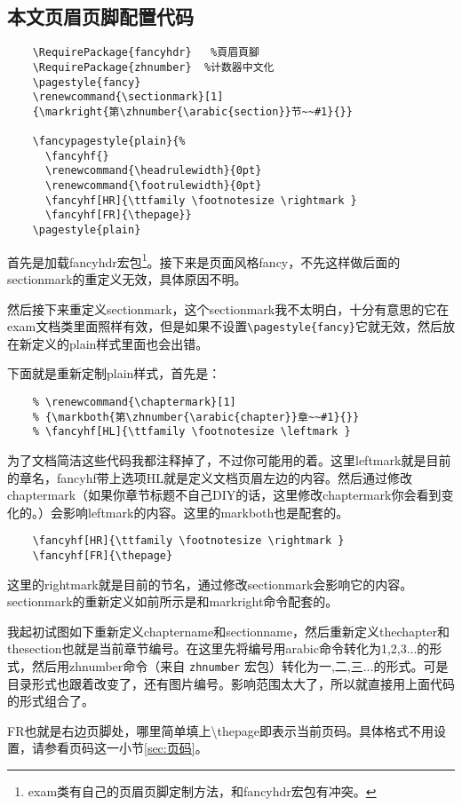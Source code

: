 \documentclass[11pt,oneside]{book}
\begin{document}
  \subsection{本文页眉页脚配置代码}
  \begin{Verbatim}
    \RequirePackage{fancyhdr}   %頁眉頁腳
    \RequirePackage{zhnumber}  %计数器中文化
    \pagestyle{fancy}
    \renewcommand{\sectionmark}[1]
    {\markright{第\zhnumber{\arabic{section}}节~~#1}{}}

    \fancypagestyle{plain}{%
      \fancyhf{}
      \renewcommand{\headrulewidth}{0pt}
      \renewcommand{\footrulewidth}{0pt}
      \fancyhf[HR]{\ttfamily \footnotesize \rightmark }
      \fancyhf[FR]{\thepage}}
    \pagestyle{plain}
  \end{Verbatim}

  首先是加载fancyhdr宏包\footnote{exam类有自己的页眉页脚定制方法，和fancyhdr宏包有冲突。}。接下来是页面风格fancy，不先这样做后面的sectionmark的重定义无效，具体原因不明。

  然后接下来重定义sectionmark，这个sectionmark我不太明白，十分有意思的它在exam文档类里面照样有效，但是如果不设置\verb+\pagestyle{fancy}+它就无效，然后放在新定义的plain样式里面也会出错。

  下面就是重新定制plain样式，首先是：
  \begin{Verbatim}
    % \renewcommand{\chaptermark}[1]
    % {\markboth{第\zhnumber{\arabic{chapter}}章~~#1}{}}
    % \fancyhf[HL]{\ttfamily \footnotesize \leftmark }
  \end{Verbatim}
  为了文档简洁这些代码我都注释掉了，不过你可能用的着。这里leftmark就是目前的章名，fancyhf带上选项HL就是定义文档页眉左边的内容。然后通过修改chaptermark（如果你章节标题不自己DIY的话，这里修改chaptermark你会看到变化的。）会影响leftmark的内容。这里的markboth也是配套的。

  \begin{Verbatim}
    \fancyhf[HR]{\ttfamily \footnotesize \rightmark }
    \fancyhf[FR]{\thepage}
  \end{Verbatim}
  这里的rightmark就是目前的节名，通过修改sectionmark会影响它的内容。sectionmark的重新定义如前所示是和markright命令配套的。


  我起初试图如下重新定义chaptername和sectionname，然后重新定义thechapter和thesection也就是当前章节编号。在这里先将编号用arabic命令转化为1,2,3...的形式，然后用zhnumber命令（来自 \verb+zhnumber+ 宏包）转化为一,二,三...的形式。可是目录形式也跟着改变了，还有图片编号。影响范围太大了，所以就直接用上面代码的形式组合了。


  FR也就是右边页脚处，哪里简单填上\textbackslash thepage即表示当前页码。具体格式不用设置，请参看页码这一小节\ref{sec:页码}。
\end{document}
